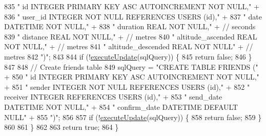 \begin{DoxyCode}
835                     \textcolor{stringliteral}{"    id                  INTEGER PRIMARY KEY ASC AUTOINCREMENT NOT NULL,"} +
836                     \textcolor{stringliteral}{"    user\_id             INTEGER NOT NULL REFERENCES USERS (id),"} +
837                     \textcolor{stringliteral}{"    date                DATETIME    NOT NULL,"} +
838                     \textcolor{stringliteral}{"    duration            REAL    NOT NULL,"} + \textcolor{comment}{// seconds}
839                     \textcolor{stringliteral}{"    distance            REAL    NOT NULL,"} + \textcolor{comment}{// metres}
840                     \textcolor{stringliteral}{"    altitude\_ascended   REAL    NOT NULL,"} + \textcolor{comment}{// metres}
841                     \textcolor{stringliteral}{"    altitude\_descended  REAL    NOT NULL"} + \textcolor{comment}{// metres}
842                     \textcolor{stringliteral}{")"};
843 
844             \textcolor{keywordflow}{if} (!\mbox{\hyperlink{classcom_1_1activitytracker_1_1_d_b_manager_a382397e2bdf309901d1c80ff66be69b7}{executeUpdate}}(sqlQuery)) \{
845                 \textcolor{keywordflow}{return} \textcolor{keyword}{false};
846             \}
847 
848             \textcolor{comment}{// Create friends table}
849             sqlQuery = \textcolor{stringliteral}{"CREATE TABLE FRIENDS ("} +
850                     \textcolor{stringliteral}{"    id            INTEGER  PRIMARY KEY ASC AUTOINCREMENT NOT NULL,"} +
851                     \textcolor{stringliteral}{"    sender        INTEGER  NOT NULL REFERENCES USERS (id),"} +
852                     \textcolor{stringliteral}{"    receiver      INTEGER  REFERENCES USERS (id),"} +
853                     \textcolor{stringliteral}{"    send\_date     DATETIME NOT NULL,"} +
854                     \textcolor{stringliteral}{"    confirm\_date  DATETIME DEFAULT NULL"} +
855                     \textcolor{stringliteral}{")"};
856 
857             \textcolor{keywordflow}{if} (!\mbox{\hyperlink{classcom_1_1activitytracker_1_1_d_b_manager_a382397e2bdf309901d1c80ff66be69b7}{executeUpdate}}(sqlQuery)) \{
858                 \textcolor{keywordflow}{return} \textcolor{keyword}{false};
859             \}
860 
861         \}
862 
863         \textcolor{keywordflow}{return} \textcolor{keyword}{true};
864     \}
\end{DoxyCode}
\mbox{\label{classcom_1_1activitytracker_1_1_d_b_manager_af9ab112f840e3c803b6b28a2f1a15215}} 
